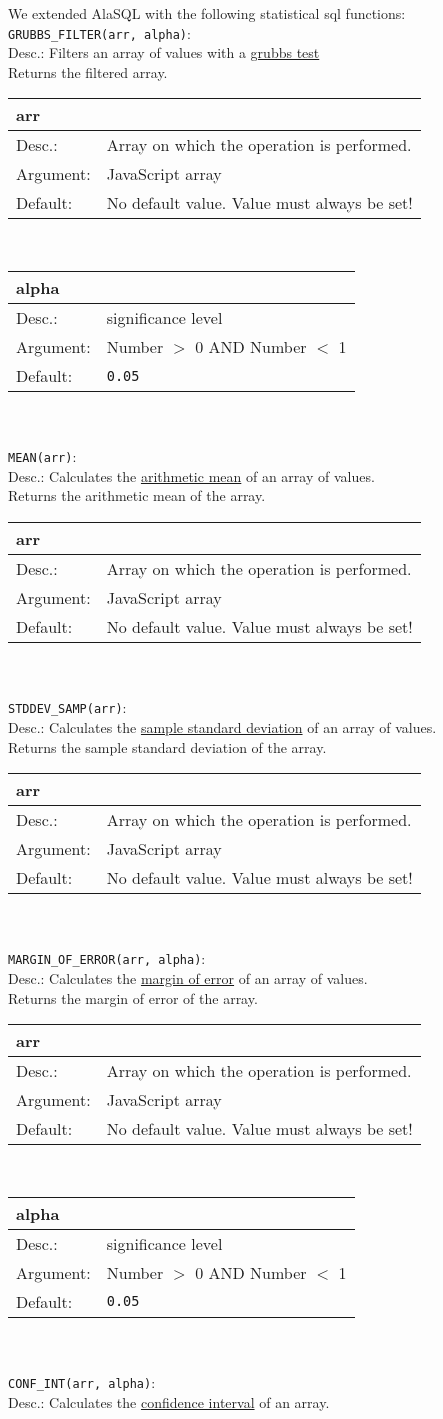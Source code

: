 \documentclass[11pt]{article}
\def\a{5cm}
\def\b{10.5cm}
\def\option#1#2#3#4{%
\noindent \begin{tabular}{|p{\a}|p{\b}|}
\hline
\textbf{#1} & \\
\hline
Desc.: & #2 \\
\hline
Argument: & #3\\
\hline
Default:& #4\\
\hline
\end{tabular} \\[4pt]%
}
\begin{document}
\noindent We extended AlaSQL with the following statistical sql functions:\\[5pt]
\verb|GRUBBS_FILTER(arr, alpha)|: \\
\indent Desc.: Filters an array of values with a \href{http://en.wikipedia.org/wiki/Grubbs'_test_for_outliers}{grubbs test}\\
\indent Returns the filtered array.\\[3pt]
\indent \option
{arr}
{Array on which the operation is performed.}
{JavaScript array}
{No default value. Value must always be set!}
\indent \option
{alpha}
{significance level}
{Number $>$ 0 AND Number $<$ 1}
{\texttt{0.05}}\\[3pt]
%
\verb|MEAN(arr)|: \\
\indent Desc.: Calculates the \href{http://en.wikipedia.org/wiki/Arithmetic_mean}{arithmetic mean} of an array of values.\\
\indent Returns the arithmetic mean of the array.\\[3pt]
\indent \option
{arr}
{Array on which the operation is performed.}
{JavaScript array}
{No default value. Value must always be set!}\\[3pt]
%
\verb|STDDEV_SAMP(arr)|: \\
\indent Desc.: Calculates the \href{http://en.wikipedia.org/wiki/Standard_deviation}{ sample standard deviation} of an array of values.\\
\indent Returns the sample standard deviation of the array.\\[3pt]
\indent \option
{arr}
{Array on which the operation is performed.}
{JavaScript array}
{No default value. Value must always be set!}\\[3pt]
%
\verb|MARGIN_OF_ERROR(arr, alpha)|: \\
\indent Desc.: Calculates the \href{http://en.wikipedia.org/wiki/Margin_of_error}{margin of error} of an array of values.\\
\indent Returns the margin of error of the array.\\[3pt]
\indent \option
{arr}
{Array on which the operation is performed.}
{JavaScript array}
{No default value. Value must always be set!}
\indent \option
{alpha}
{significance level}
{Number $>$ 0 AND Number $<$ 1}
{\texttt{0.05}}\\[3pt]
%
\verb|CONF_INT(arr, alpha)|: \\
\indent Desc.: Calculates the \href{http://en.wikipedia.org/wiki/Confidence_interval}{confidence interval} of an array.\\
\end{document}

